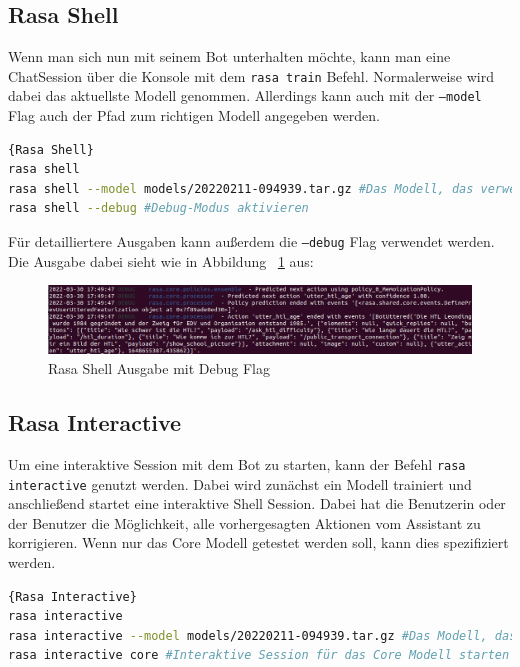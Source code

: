 \subsection{Rasa Shell}\label{subsec:rasa-shell}

Wenn man sich nun mit seinem Bot unterhalten möchte, kann man eine ChatSession über die Konsole mit dem \texttt{rasa train} Befehl.
Normalerweise wird dabei das aktuellste Modell genommen.
Allerdings kann auch mit der \texttt{--model} Flag auch der Pfad zum richtigen Modell angegeben werden.

\begin{lstlisting}[language=bash,label={lst:shell-command},caption={Rasa Shell Befehle}]{Rasa Shell}
rasa shell
rasa shell --model models/20220211-094939.tar.gz #Das Modell, das verwendet werden soll
rasa shell --debug #Debug-Modus aktivieren
\end{lstlisting}

Für detailliertere Ausgaben kann außerdem die \texttt{--debug} Flag verwendet werden.
Die Ausgabe dabei sieht wie in Abbildung ~\ref{fig:rasa_shell} aus:

\begin{figure}[hbt!]
    \centering
    \includegraphics[scale=0.40]{pics/rasa_shell}
    \caption{Rasa Shell Ausgabe mit Debug Flag}
    \label{fig:rasa_shell}
\end{figure}

\subsection{Rasa Interactive}\label{subsec:rasa-interactive}

Um eine interaktive Session mit dem Bot zu starten, kann der Befehl \texttt{rasa interactive} genutzt werden.
Dabei wird zunächst ein Modell trainiert und anschließend startet eine interaktive Shell Session.
Dabei hat die Benutzerin oder der Benutzer die Möglichkeit, alle vorhergesagten Aktionen vom Assistant zu korrigieren.
Wenn nur das Core Modell getestet werden soll, kann dies spezifiziert werden.

\begin{lstlisting}[language=bash,label={lst:interactive-command},caption={Interaktive Trainingssession starten}]{Rasa Interactive}
rasa interactive
rasa interactive --model models/20220211-094939.tar.gz #Das Modell, das verwendet werden soll
rasa interactive core #Interaktive Session für das Core Modell starten
\end{lstlisting}

